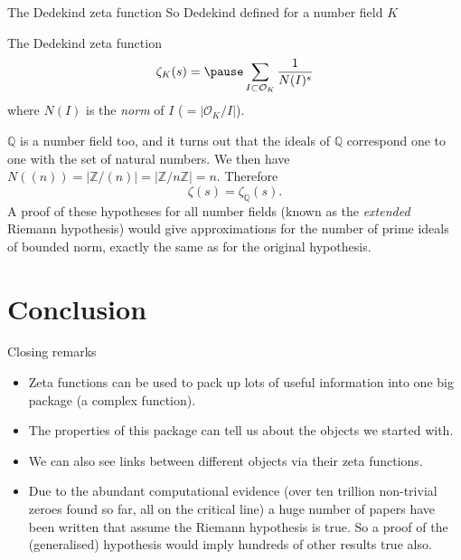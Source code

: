 \documentclass{beamer}
\begin{document}
\begin{frame}{The Dedekind zeta function}
So Dedekind defined for a number field $K$
\begin{block}{The Dedekind zeta function}
\[\zeta_K(s) = \pause \sum_{I\subset \mathcal{O}_K} \frac{1}{N(I)^s}\]
where $N(I)$ is the \emph{norm} of $I$ ($ = |\mathcal{O}_K/I|$). 
\end{block}
\pause $\mathbb{Q}$ is a number field too, and it turns out that the ideals of $\mathbb{Q}$ correspond one to one with the set of natural numbers.
We then have $N((n)) = |\mathbb{Z}/(n)|= |\mathbb{Z}/n\mathbb{Z}| = n$.
\pause Therefore
\[\zeta(s) = \zeta_\mathbb{Q}(s).\]
\pause A proof of these hypotheses for all number fields (known as the \emph{extended} Riemann hypothesis) would give approximations for the number of prime ideals of bounded norm, exactly the same as for the original hypothesis.
\end{frame}

\section{Conclusion}
\begin{frame}{Closing remarks}
\begin{itemize}
\item Zeta functions can be used to pack up lots of useful information into one big package (a complex function).
\pause\item The properties of this package can tell us about the objects we started with.
\pause\item We can also see links between different objects via their zeta functions.
\pause\item Due to the abundant computational evidence (over ten trillion non-trivial zeroes found so far, all on the critical line) a huge number of papers have been written that assume the Riemann hypothesis is true.
So a proof of the (generalised) hypothesis would imply hundreds of other results true also.
\end{itemize}
\end{frame}
\end{document}
